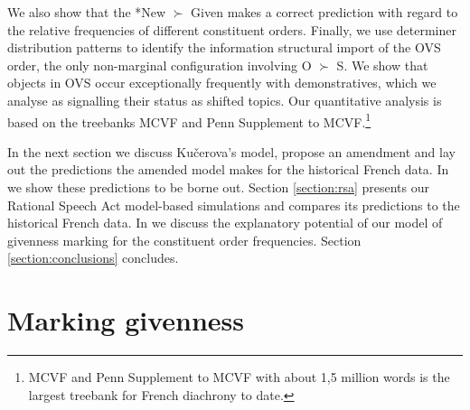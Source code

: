 \documentclass[output=paper,modfonts,nonflat]{langsci/langscibook}
\begin{document}
We also show that the *New $\succ$ Given makes a correct prediction with regard to the relative frequencies of different constituent orders. Finally, we use determiner distribution patterns to identify the information structural import of the OVS order, the only non-marginal configuration involving O $\succ$ S. We show that objects in OVS occur exceptionally frequently with demonstratives, which we analyse as signalling their status as shifted topics. Our quantitative analysis is based on the treebanks MCVF and Penn Supplement to MCVF.\footnote{MCVF and Penn Supplement to MCVF with about 1,5 million words is the largest treebank for French diachrony to date.} 

In the next section we discuss Ku\v{c}erova's model, propose an amendment and lay out the predictions the amended model makes for the historical French data. In  we show these predictions to be borne out. Section \ref{section:rsa} presents our Rational Speech Act model-based simulations and compares its predictions to the historical French data. In  we discuss the explanatory potential of our model of givenness marking for the constituent order frequencies. Section \ref{section:conclusions} concludes. 

\nocite{MCVF}
\nocite{Penn}



\section{Marking givenness}
\end{document}
